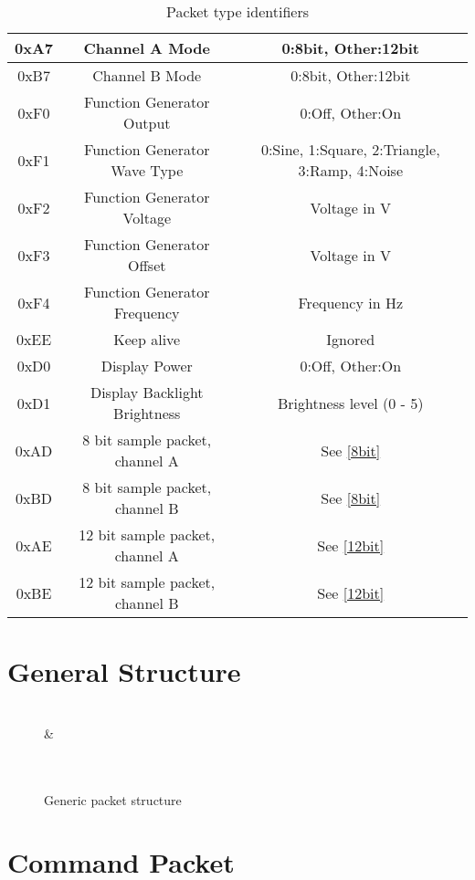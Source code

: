 \documentclass[]{article}
\begin{document}
\begin{table}[H]
\begin{tabular}{|c|c|c|}
		0xA7 & Channel A Mode & 0:8bit, Other:12bit \\ \hline
		0xB7 & Channel B Mode & 0:8bit, Other:12bit \\ \hline
		0xF0 & Function Generator Output & 0:Off, Other:On \\ \hline
		0xF1 & Function Generator Wave Type & 0:Sine, 1:Square, 2:Triangle, 3:Ramp, 4:Noise \\ \hline
		0xF2 & Function Generator Voltage & Voltage in \textmu V \\ \hline
		0xF3 & Function Generator Offset & Voltage in \textmu V \\ \hline
		0xF4 & Function Generator Frequency & Frequency in Hz \\ \hline
		0xEE & Keep alive & Ignored \\ \hline
		0xD0 & Display Power & 0:Off, Other:On \\ \hline
		0xD1 & Display Backlight Brightness & Brightness level (0 - 5) \\ \hline
		0xAD & 8 bit sample packet, channel A & See \autoref{8bit} \\ \hline
		0xBD & 8 bit sample packet, channel B & See \autoref{8bit} \\ \hline
		0xAE & 12 bit sample packet, channel A & See \autoref{12bit} \\ \hline
		0xBE & 12 bit sample packet, channel B & See \autoref{12bit} \\ \hline
	\end{tabular}
	\caption{Packet type identifiers}
\end{table}

\section{General Structure}
\begin{figure}[H]
	\centering
	\begin{bytefield}[bitwidth=2em]{16}
		 \\
		 &  \\
		 \\
		 \\
	\end{bytefield}
	\caption{Generic packet structure}
\end{figure}

\section{Command Packet}
\end{document}

